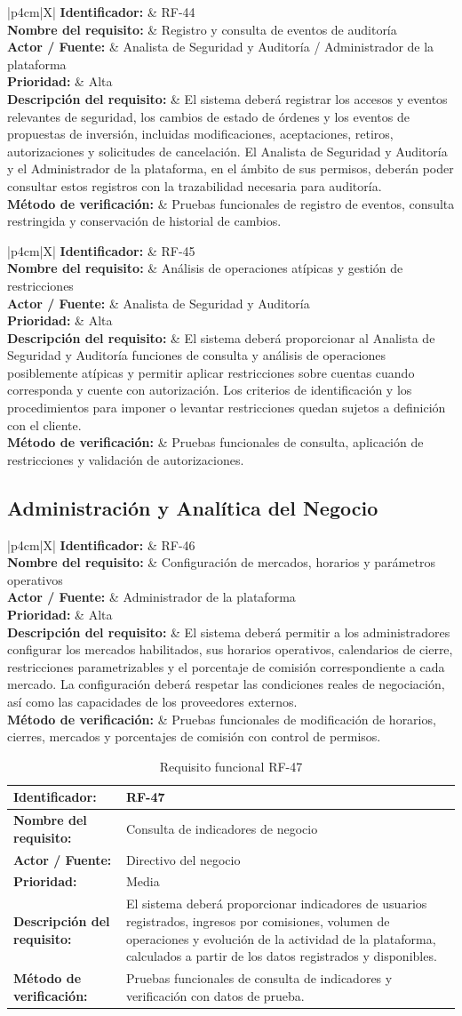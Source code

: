 \documentclass[11pt,a4paper,oneside]{article}
\newcommand{\tablaRequisito}[6]{%
\begin{table}[H]
\centering
\begin{tabularx}{\linewidth}{|p{4cm}|X|}
\hline
\textbf{Identificador:} & #1 \\ \hline
\textbf{Nombre del requisito:} & #2 \\ \hline
\textbf{Actor / Fuente:} & #3 \\ \hline
\textbf{Prioridad:} & #4 \\ \hline
\textbf{Descripción del requisito:} &
#5 \\ \hline
\textbf{Método de verificación:} & #6 \\ \hline
\end{tabularx}
\caption{Requisito funcional #1}
\label{tab:#1}
\end{table}
}
\begin{document}
\tablaRequisito
{RF-44}
{Registro y consulta de eventos de auditoría}
{Analista de Seguridad y Auditoría / Administrador de la plataforma}
{Alta}
{El sistema deberá registrar los accesos y eventos relevantes de seguridad, los cambios de estado de órdenes y los eventos de propuestas de inversión, incluidas modificaciones, aceptaciones, retiros, autorizaciones y solicitudes de cancelación. El Analista de Seguridad y Auditoría y el Administrador de la plataforma, en el ámbito de sus permisos, deberán poder consultar estos registros con la trazabilidad necesaria para auditoría.}
{Pruebas funcionales de registro de eventos, consulta restringida y conservación de historial de cambios.}


\tablaRequisito
{RF-45}
{Análisis de operaciones atípicas y gestión de restricciones}
{Analista de Seguridad y Auditoría}
{Alta}
{El sistema deberá proporcionar al Analista de Seguridad y Auditoría funciones de consulta y análisis de operaciones posiblemente atípicas y permitir aplicar restricciones sobre cuentas cuando corresponda y cuente con autorización. Los criterios de identificación y los procedimientos para imponer o levantar restricciones quedan sujetos a definición con el cliente.}
{Pruebas funcionales de consulta, aplicación de restricciones y validación de autorizaciones.}


\subsection{Administración y Analítica del Negocio}

\tablaRequisito
{RF-46}
{Configuración de mercados, horarios y parámetros operativos}
{Administrador de la plataforma}
{Alta}
{El sistema deberá permitir a los administradores configurar los mercados habilitados, sus horarios operativos, calendarios de cierre, restricciones parametrizables y el porcentaje de comisión correspondiente a cada mercado. La configuración deberá respetar las condiciones reales de negociación, así como las capacidades de los proveedores externos.}
{Pruebas funcionales de modificación de horarios, cierres, mercados y porcentajes de comisión con control de permisos.}


\tablaRequisito
{RF-47}
{Consulta de indicadores de negocio}
{Directivo del negocio}
{Media}
{El sistema deberá proporcionar indicadores de usuarios registrados, ingresos por comisiones, volumen de operaciones y evolución de la actividad de la plataforma, calculados a partir de los datos registrados y disponibles.}
{Pruebas funcionales de consulta de indicadores y verificación con datos de prueba.}
\end{document}
